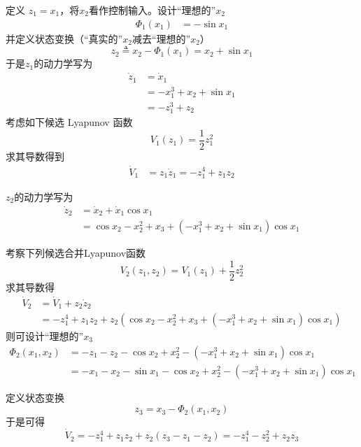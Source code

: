 定义 $z_1 = x_1$，将$x_2$看作控制输入。设计“理想的”$x_2$
\begin{align*}
  \Phi_1 (x_1) & = -\sin x_1
\end{align*}
并定义状态变换（“真实的”$x_2$减去“理想的”$x_2$）
\[ z_2 \triangleq x_2 - \Phi_1 (x_1)= x_2 +\sin x_1\]
于是$z_1$的动力学写为
\begin{align*}
  \dot{z}_1 & = \dot{x}_1\\
  & = -x_1^3+ x_2+\sin x_1\\
  & =  -z_1^3+z_2
\end{align*}
考虑如下候选 Lyapunov 函数
\[ V_1 (z_1) = \frac{1}{2} z^2_1 \]
求其导数得到
\begin{align*}
  \dot{V}_1 & = z_1 \dot{z}_1 = -z_1^4+z_1z_2
\end{align*}


$z_2$的动力学写为
  \begin{align*}
  \dot{z}_2 & = \dot{x}_2 +\dot{x}_1\cos x_1 \\
  & = \cos x_2-x_2^2 + x_3 + (-x_1^3+ x_2+\sin x_1)\cos x_1
\end{align*}

考察下列候选合并Lyapunov函数
\[ V_2 (z_1, z_2) = V_1 (z_1) + \frac{1}{2} z^2_2 \]
求其导数得
\begin{align*}
  \dot{V}_2 & = \dot{V}_1 + z_2 \dot{z}_2\\
  & = -z_1^4+z_1z_2+z_2(\cos x_2-x_2^2 + x_3 + (-x_1^3+ x_2+\sin x_1)\cos x_1)
\end{align*}
则可设计“理想的”$x_3$
\begin{align*}
    \Phi_2(x_1,x_2) &= -z_1-z_2-\cos x_2+x_2^2- (-x_1^3+ x_2+\sin x_1)\cos x_1 \\&= -x_1-x_2-\sin x_1 -\cos x_2+x_2^2-(-x_1^3+ x_2+\sin x_1)\cos x_1 
\end{align*}

定义状态变换
\[z_3 = x_3 - \Phi_2(x_1,x_2) \]
于是可得
\[ \dot{V}_2 = -z_1^4+z_1z_2+z_2(z_3-z_1-z_2) = - z_1^4 - z^2_2+z_2z_3 \]


